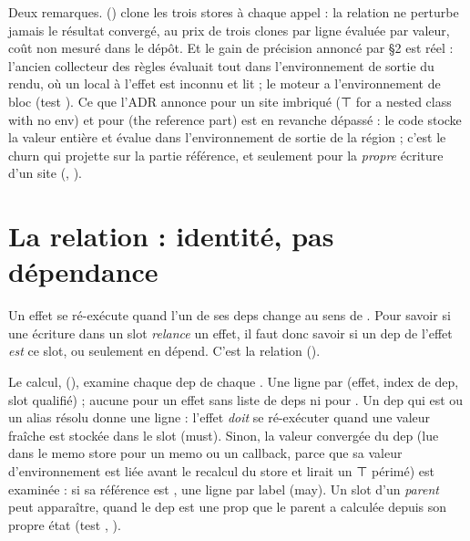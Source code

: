 Deux remarques.  () clone les trois stores à chaque appel : la relation ne perturbe jamais le résultat convergé, au prix de trois clones par ligne évaluée par valeur, coût non mesuré dans le dépôt. Et le gain de précision annoncé par  §2 est réel : l'ancien collecteur des règles évaluait tout dans l'environnement de sortie du rendu, où un  local à l'effet est inconnu et lit  ; le moteur a l'environnement de bloc (test ). Ce que l'ADR annonce pour un site imbriqué (\og ⊤ for a nested class with no env\fg{}) et pour  (\og the reference part\fg{}) est en revanche dépassé : le code stocke la valeur entière et évalue dans l'environnement de sortie de la région ; c'est le churn qui projette sur la partie référence, et seulement pour la \emph{propre} écriture d'un site (, ).

\section{La relation  : identité, pas dépendance}
\label{sec:relations-triggers}
Un effet se ré-exécute quand l'un de ses deps change au sens de . Pour savoir si une écriture dans un slot \emph{relance} un effet, il faut donc savoir si un dep de l'effet \emph{est} ce slot, ou seulement en dépend. C'est la relation  ().


Le calcul,  (), examine chaque dep de chaque . Une ligne par (effet, index de dep, slot qualifié) ; aucune pour un effet sans liste de deps ni pour \code{[]}. Un dep qui est  ou un alias résolu donne une ligne  : l'effet \emph{doit} se ré-exécuter quand une valeur fraîche est stockée dans le slot (must). Sinon, la valeur convergée du dep (lue dans le memo store pour un memo ou un callback, parce que sa valeur d'environnement est liée avant le recalcul du store et lirait un ⊤ périmé) est examinée : si sa référence est , une ligne  par label (may). Un slot d'un \emph{parent} peut apparaître, quand le dep est une prop que le parent a calculée depuis son propre état (test , ).

